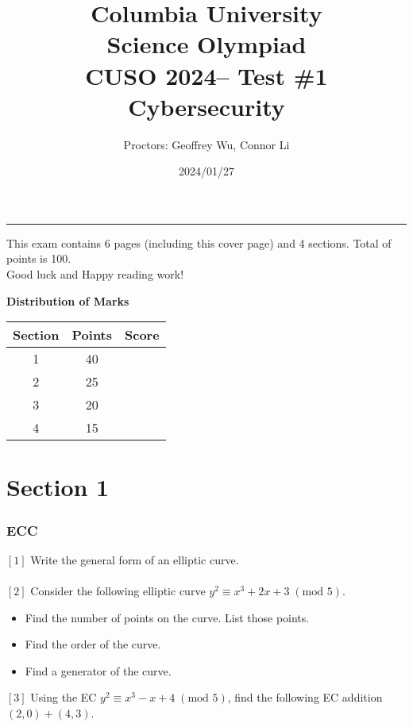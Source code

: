 \documentclass[letterpaper,12pt,addpoints]{exam}
\newcommand{\university}{Columbia University}
\newcommand{\faculty}{Science Olympiad}
\newcommand{\class}{CUSO 2024}
\newcommand{\examnum}{Test \#1}
\newcommand{\content}{Cybersecurity}
\newcommand{\examdate}{2024/01/27}
\begin{document}
\title{\Large \textbf{\university\\ \faculty\\
\bigskip
\class -- \examnum \\ \content}}
\author{Proctors: Geoffrey Wu, Connor Li}
\date{\examdate}
\maketitle
\begin{flushleft}
\medskip
{}
\end{flushleft}
\noindent \rule{\textwidth}{1pt}

\noindent This exam contains 6 pages (including this cover page) and 4 sections. Total of points is 100.\\
Good luck and Happy reading work!

\begin{center}
\textbf{Distribution of Marks}\\
\end{center}
\begin{center}
\begin{tabular} {| c | c | c |}
    \hline
    Section & Points & Score \\
    \hline
    1 & 40 & \\
    \hline
    2 & 25 & \\
    \hline
    3 & 20 & \\
    \hline
    4 & 15 & \\
    \hline
\end{tabular}
\end{center}
\clearpage

\section*{Section 1}
\subsubsection*{ECC}
$[1]$ Write the general form of an elliptic curve.\\
\\
$[2]$ Consider the following elliptic curve $y^2 \equiv x^3 + 2x + 3\;(\text{mod } 5)$. 
\begin{itemize}
    \item Find the number of points on the curve. List those points.
    \item Find the order of the curve.
    \item Find a generator of the curve.
\end{itemize}
$[3]$ Using the EC $y^2 \equiv x^3 - x + 4 \;(\text{mod } 5)$, find the following EC addition $(2,0) + (4,3)$.
\end{document}

